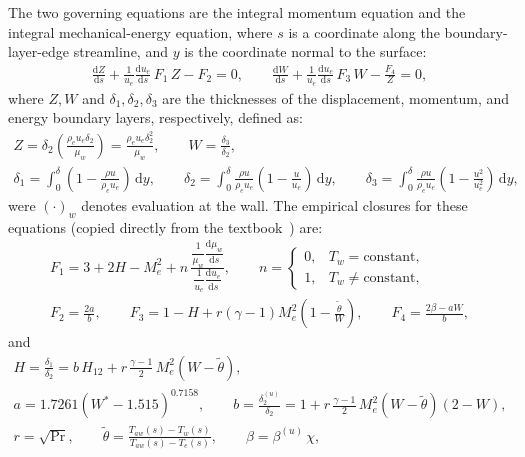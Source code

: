 \documentclass[10pt,a4paper]{article}
\begin{document}
The two governing equations are the integral momentum equation and the integral mechanical-energy equation, where $s$ is a coordinate along the boundary-layer-edge streamline, and $y$ is the coordinate normal to the surface:
\begin{gather}
    \frac{\mathrm{d}Z}{\mathrm{d}s}
    + \frac{1}{u_e}\frac{\mathrm{d}u_e}{\mathrm{d}s}\,F_1\,Z
    - F_2 = 0,\qquad
    \frac{\mathrm{d}W}{\mathrm{d}s}
    + \frac{1}{u_e}\frac{\mathrm{d}u_e}{\mathrm{d}s}\,F_3\,W
    - \frac{F_4}{Z} = 0,
\end{gather}
where $Z,W$ and $\delta_1,\delta_2,\delta_3$ are the thicknesses of the displacement, momentum, and energy boundary layers, respectively, defined as:
\begin{gather}
    Z = \delta_2\left(\frac{\rho_e u_e \delta_2}{\mu_w}\right)
    = \frac{\rho_e u_e \delta_2^2}{\mu_w},\qquad
    W = \frac{\delta_3}{\delta_2},\\[4pt]
    \delta_1 = \int_0^\delta
    \left(1-\frac{\rho u}{\rho_e u_e}\right)\,\mathrm{d}y,\qquad
    \delta_2 = \int_0^\delta
    \frac{\rho u}{\rho_e u_e}
    \left(1-\frac{u}{u_e}\right)\,\mathrm{d}y,\qquad
    \delta_3 = \int_0^\delta
    \frac{\rho u}{\rho_e u_e}
    \left(1-\frac{u^2}{u_e^2}\right)\,\mathrm{d}y,
\end{gather}
were ${(\cdot)}_w$ denotes evaluation at the wall. The empirical closures for these equations (copied directly from the textbook~\cite{Walz:1969}) are:
\begin{gather}
    F_1 = 3 + 2H - M_e^2
    + n\,
    \frac{\dfrac{1}{\mu_w}\dfrac{\mathrm{d}\mu_w}{\mathrm{d}s}}
        {\dfrac{1}{u_e}\dfrac{\mathrm{d}u_e}{\mathrm{d}s}},
    \qquad
    n =
    \begin{cases}
    0, & T_w = \text{constant},\\
    1, & T_w \neq \text{constant},
    \end{cases}\\[6pt]
    F_2 = \frac{2a}{b},\qquad
    F_3 = 1 - H + r(\gamma-1)M_e^2\left(1-\frac{\widetilde{\theta}}{W}\right),\qquad
    F_4 = \frac{2\beta - aW}{b},
\end{gather}
and
\begin{gather}
    H = \frac{\delta_1}{\delta_2}
    = b\,H_{12}
    + r\,\frac{\gamma-1}{2}\,M_e^2\left(W-\widetilde{\theta}\right),\\[4pt]
    a = 1.7261\left(W^\ast - 1.515\right)^{0.7158},\qquad
    b = \frac{\delta_2^{(u)}}{\delta_2}
    = 1 + r\,\frac{\gamma-1}{2}\,M_e^2
    \left(W-\widetilde{\theta}\right)\left(2-W\right),\\[4pt]
    r = \sqrt{\Pr},\qquad
    \widetilde{\theta} =
    \frac{T_{aw}(s)-T_w(s)}{T_{aw}(s)-T_e(s)},\qquad
    \beta = \beta^{(u)}\,\chi,
\end{gather}
\end{document}

